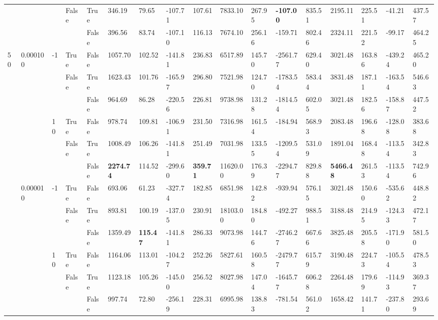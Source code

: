 {\begin{tabular}{lllllllllllllllll}
\cline{4-17}
 &  &  & \multirow[t]{2}{*}{False} & True & 346.19 & 79.65 & -107.71 & 107.61 & 7833.10 & 267.95 & \textbf{-107.00} & 835.51 & 2195.11 & 225.51 & -41.21 & 437.57 \\
 &  &  &  & False & 396.56 & 83.74 & -107.10 & 116.13 & 7674.10 & 256.16 & -159.71 & 802.46 & 2324.11 & 221.52 & -99.17 & 464.25 \\
\cline{1-17} \cline{2-17} \cline{3-17} \cline{4-17}
\multirow[t]{12}{*}{50} & \multirow[t]{6}{*}{0.000100} & \multirow[t]{3}{*}{-1} & True & False & 1057.70 & 102.52 & -141.81 & 236.83 & 6517.89 & 145.70 & -2561.77 & 629.40 & 3021.48 & 163.86 & -439.24 & 465.20 \\
\cline{4-17}
 &  &  & \multirow[t]{2}{*}{False} & True & 1623.43 & 101.76 & -165.97 & 296.80 & 7521.98 & 124.70 & -1783.54 & 583.44 & 3831.48 & 187.11 & -163.54 & 546.63 \\
 &  &  &  & False & 964.69 & 86.28 & -220.56 & 226.81 & 9738.98 & 131.28 & -1814.54 & 602.05 & 3021.48 & 182.56 & -158.87 & 447.52 \\
\cline{3-17} \cline{4-17}
 &  & \multirow[t]{3}{*}{10} & True & False & 978.74 & 109.81 & -106.91 & 231.50 & 7316.98 & 161.54 & -184.94 & 568.93 & 2083.48 & 196.68 & -128.08 & 383.68 \\
\cline{4-17}
 &  &  & \multirow[t]{2}{*}{False} & True & 1008.49 & 106.26 & -141.81 & 251.49 & 7031.98 & 133.55 & -1209.54 & 531.09 & 1891.04 & 168.48 & -113.54 & 342.83 \\
 &  &  &  & False & \textbf{2274.74} & 114.52 & -299.60 & \textbf{359.71} & 11620.00 & 176.39 & -2294.77 & 829.88 & \textbf{5466.48} & 261.53 & -113.54 & 742.96 \\
\cline{2-17} \cline{3-17} \cline{4-17}
 & \multirow[t]{6}{*}{0.000010} & \multirow[t]{3}{*}{-1} & True & False & 693.06 & 61.23 & -327.74 & 182.85 & 6851.98 & 142.82 & -939.94 & 576.15 & 3021.48 & 150.60 & -535.62 & 448.82 \\
\cline{4-17}
 &  &  & \multirow[t]{2}{*}{False} & True & 893.81 & 100.19 & -137.05 & 230.91 & 18103.00 & 184.80 & -492.27 & 988.51 & 3188.48 & 214.95 & -124.33 & 472.17 \\
 &  &  &  & False & 1359.49 & \textbf{115.47} & -141.81 & 286.33 & 9073.98 & 144.76 & -2746.27 & 667.66 & 3825.48 & 205.58 & -171.90 & 581.50 \\
\cline{3-17} \cline{4-17}
 &  & \multirow[t]{3}{*}{10} & True & False & 1164.06 & 113.01 & -104.27 & 252.26 & 5827.61 & 160.58 & -2479.77 & 615.79 & 3190.48 & 224.73 & -105.54 & 478.53 \\
\cline{4-17}
 &  &  & \multirow[t]{2}{*}{False} & True & 1123.18 & 105.26 & -145.00 & 256.52 & 8027.98 & 147.04 & -1645.77 & 606.28 & 2264.48 & 179.69 & -114.93 & 369.37 \\
 &  &  &  & False & 997.74 & 72.80 & -256.19 & 228.31 & 6995.98 & 138.83 & -781.54 & 561.02 & 1658.42 & 141.71 & -237.80 & 293.69 \\
\cline{1-17} \cline{2-17} \cline{3-17} \cline{4-17}
\bottomrule
\end{tabular}

\label{tab:il_}
}